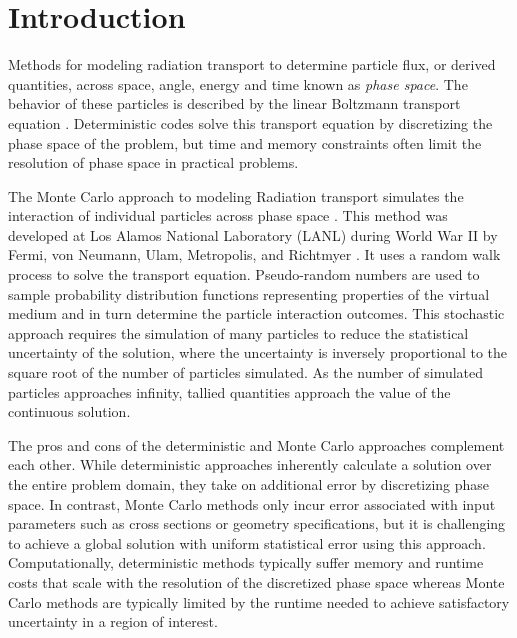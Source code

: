 \newcommand{\dagmcModel}[2] {
  \null %
  \textbf{\uppercase{#1}} 
  \begin{adjustwidth}{2.5em}{0pt}
    #2
  \end{adjustwidth}
  \null
}

\chapter{Introduction}\label{ch:introduction}

Methods for modeling radiation transport to determine particle flux, or derived
quantities, across space, angle, energy and time known as \textit{phase
  space}. The behavior of these particles is described by the linear Boltzmann
transport equation \cite{Ulam_1949}. Deterministic codes solve this transport
equation by discretizing the phase space of the problem, but time and memory
constraints often limit the resolution of phase space in practical problems.

The Monte Carlo approach to modeling Radiation transport simulates the
interaction of individual particles across phase space \cite{Lewis_1993}. This
method was developed at Los Alamos National Laboratory (LANL) during World War
II by Fermi, von Neumann, Ulam, Metropolis, and Richtmyer \cite{LANL_1987}. It
uses a random walk process to solve the transport equation. Pseudo-random
numbers are used to sample probability distribution functions representing
properties of the virtual medium and in turn determine the particle interaction
outcomes. This stochastic approach requires the simulation of many particles to
reduce the statistical uncertainty of the solution, where the uncertainty is
inversely proportional to the square root of the number of particles
simulated. As the number of simulated particles approaches infinity, tallied
quantities approach the value of the continuous solution.

The pros and cons of the deterministic and Monte Carlo approaches complement
each other. While deterministic approaches inherently calculate a solution over
the entire problem domain, they take on additional error by discretizing phase
space. In contrast, Monte Carlo methods only incur error associated with input
parameters such as cross sections or geometry specifications, but it is
challenging to achieve a global solution with uniform statistical error using
this approach. Computationally, deterministic methods typically suffer memory
and runtime costs that scale with the resolution of the discretized phase space
whereas Monte Carlo methods are typically limited by the runtime needed to
achieve satisfactory uncertainty in a region of interest.


